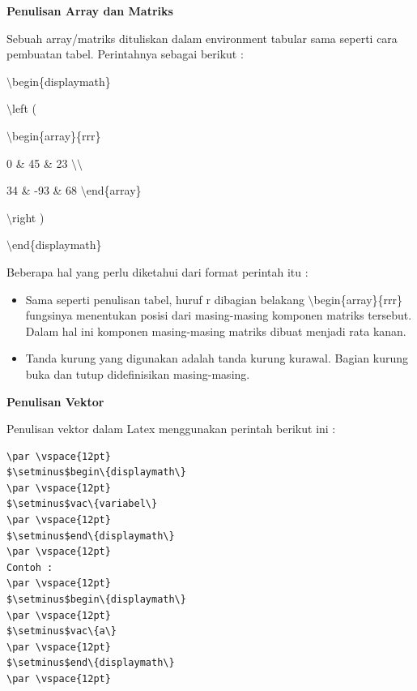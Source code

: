 \textbf{Penulisan Array dan Matriks}
\par \vspace{12pt}
Sebuah array/matriks dituliskan dalam environment tabular sama seperti cara pembuatan tabel. Perintahnya sebagai berikut :
\par \vspace{12pt}
$\setminus$begin\{displaymath\}
\par \vspace{12pt}
$\setminus$left (
\par \vspace{12pt}
$\setminus$begin\{array\}\{rrr\}
\par \vspace{12pt}
0 \& 45 \& 23 $\setminus$$\setminus$
\par \vspace{12pt}
34 \& -93 \& 68 $\setminus$end\{array\}
\par \vspace{12pt}
$\setminus$right )
\par \vspace{12pt}
$\setminus$end\{displaymath\}
\par \vspace{12pt}


Beberapa hal yang perlu diketahui dari format perintah itu :

\begin{itemize}
\item Sama seperti penulisan tabel, huruf r dibagian belakang 
$\setminus$begin\{array\}\{rrr\} fungsinya menentukan posisi dari masing-masing komponen matriks tersebut. Dalam hal ini komponen masing-masing matriks dibuat menjadi rata kanan.
\item Tanda kurung yang digunakan adalah tanda kurung kurawal. Bagian kurung buka dan tutup didefinisikan masing-masing.
\end{itemize}


\textbf{Penulisan Vektor}\par \vspace{12pt}

Penulisan vektor dalam Latex menggunakan perintah berikut ini :
\begin{verbatim}
\par \vspace{12pt}
$\setminus$begin\{displaymath\}
\par \vspace{12pt}
$\setminus$vac\{variabel\}
\par \vspace{12pt}
$\setminus$end\{displaymath\}
\par \vspace{12pt}
Contoh :
\par \vspace{12pt}
$\setminus$begin\{displaymath\}
\par \vspace{12pt}
$\setminus$vac\{a\}
\par \vspace{12pt}
$\setminus$end\{displaymath\}
\par \vspace{12pt}
\end{verbatim}

